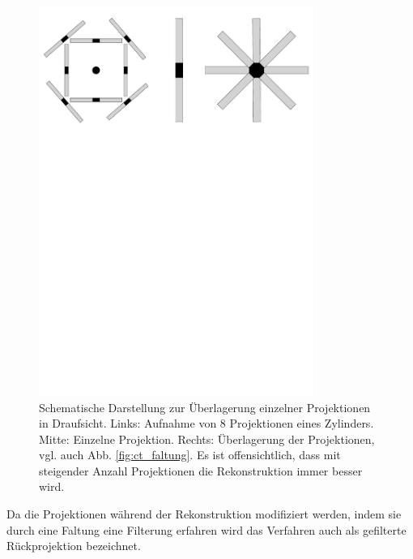 \documentclass[11pt, a4paper]{article}
\numberwithin{equation}{section}
\begin{document}
\begin{enumerate}
\begin{figure}
		\includegraphics[width=0.8\textwidth]{./figures/ct/ueberlagerung.pdf}
		\caption{Schematische Darstellung zur Überlagerung einzelner Projektionen in Draufsicht. Links: Aufnahme von 8 Projektionen eines Zylinders. Mitte: Einzelne Projektion. Rechts: Überlagerung der Projektionen, vgl. auch Abb. \ref{fig:ct_faltung}. Es ist offensichtlich, dass mit steigender Anzahl Projektionen die Rekonstruktion immer besser wird.}
		\label{fig:ct_überlagerung}
	\end{figure}
\end{enumerate}
Da die Projektionen während der Rekonstruktion modifiziert werden, indem sie durch eine Faltung eine Filterung erfahren wird das Verfahren auch als gefilterte Rückprojektion bezeichnet.
\end{document}
